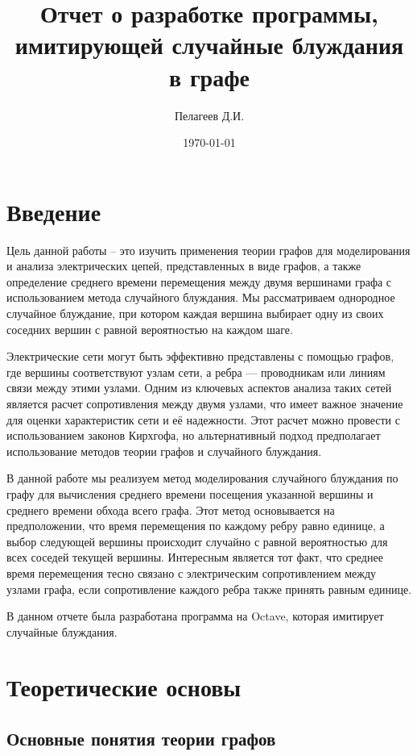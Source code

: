 \documentclass{article}
\title{Отчет о разработке программы, имитирующей случайные блуждания в графе}
\author{Пелагеев Д.И.}
\date{\today}
\begin{document}
\maketitle
\newpage
\tableofcontents
\newpage

\section{Введение}
Цель данной работы – это изучить применения теории графов для моделирования и анализа электрических цепей, представленных в виде графов, а также определение среднего времени перемещения между двумя вершинами графа с использованием метода случайного блуждания. Мы рассматриваем однородное случайное блуждание, при котором каждая вершина выбирает одну из своих соседних вершин с равной вероятностью на каждом шаге.

Электрические сети могут быть эффективно представлены с помощью графов, где вершины соответствуют узлам сети, а ребра — проводникам или линиям связи между этими узлами. Одним из ключевых аспектов анализа таких сетей является расчет сопротивления между двумя узлами, что имеет важное значение для оценки характеристик сети и её надежности. Этот расчет можно провести с использованием законов Кирхгофа, но альтернативный подход предполагает использование методов теории графов и случайного блуждания.

В данной работе мы реализуем метод моделирования случайного блуждания по графу для вычисления среднего времени посещения указанной вершины и среднего времени обхода всего графа. Этот метод основывается на предположении, что время перемещения по каждому ребру равно единице, а выбор следующей вершины происходит случайно с равной вероятностью для всех соседей текущей вершины. Интересным является тот факт, что среднее время перемещения тесно связано с электрическим сопротивлением между узлами графа, если сопротивление каждого ребра также принять равным единице.

В данном отчете была разработана программа на Octave, которая имитирует случайные блуждания.
\newpage

\section{Теоретические основы}

\subsection{Основные понятия теории графов}
\end{document}
